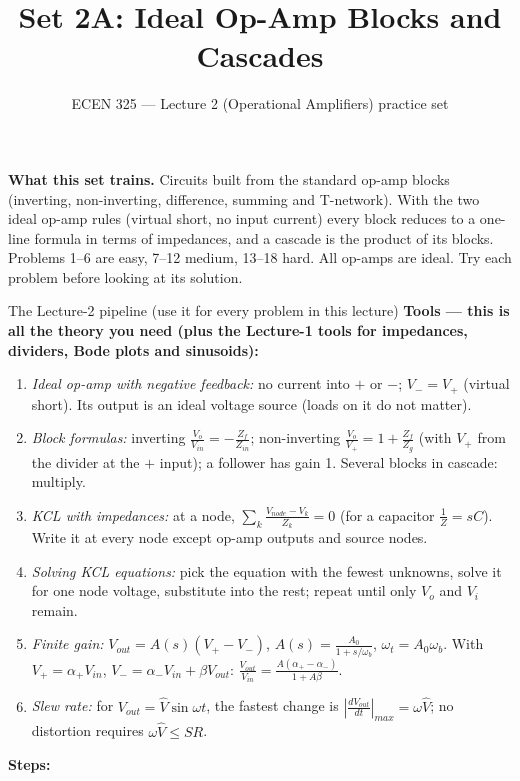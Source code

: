 \documentclass[11pt]{article}
\title{Set 2A: Ideal Op-Amp Blocks and Cascades}
\author{ECEN 325 --- Lecture 2 (Operational Amplifiers) practice set}
\date{}
\begin{document}
\maketitle

\textbf{What this set trains.} Circuits built from the standard op-amp blocks (inverting, non-inverting,
difference, summing and T-network). With the two ideal op-amp rules (virtual short, no input current) every block
reduces to a one-line formula in terms of impedances, and a cascade is the product of its blocks. Problems 1--6 are
easy, 7--12 medium, 13--18 hard. All op-amps are ideal. Try each problem before looking at its solution.


\begin{cardbox}{The Lecture-2 pipeline (use it for every problem in this lecture)}
\textbf{Tools --- this is all the theory you need (plus the Lecture-1 tools for impedances, dividers, Bode plots
and sinusoids):}
\begin{enumerate}[label=\textbf{T\arabic*},leftmargin=2.2em,itemsep=1pt]
\item \emph{Ideal op-amp with negative feedback:} no current into $+$ or $-$; $V_-=V_+$ (virtual short).
      Its output is an ideal voltage source (loads on it do not matter).
\item \emph{Block formulas:} inverting $\frac{V_o}{V_{in}}=-\frac{Z_f}{Z_{in}}$; non-inverting
      $\frac{V_o}{V_+}=1+\frac{Z_f}{Z_g}$ (with $V_+$ from the divider at the $+$ input); a follower has gain 1.
      Several blocks in cascade: multiply.
\item \emph{KCL with impedances:} at a node, $\sum_k \frac{V_{node}-V_k}{Z_k}=0$ (for a capacitor
      $\frac{1}{Z}=sC$). Write it at every node except op-amp outputs and source nodes.
\item \emph{Solving KCL equations:} pick the equation with the fewest unknowns, solve it for one node voltage,
      substitute into the rest; repeat until only $V_o$ and $V_i$ remain.
\item \emph{Finite gain:} $V_{out}=A(s)(V_+-V_-)$, $A(s)=\frac{A_0}{1+s/\omega_b}$, $\omega_t=A_0\omega_b$.
      With $V_+=\alpha_+V_{in}$, $V_-=\alpha_-V_{in}+\beta V_{out}$: $\frac{V_{out}}{V_{in}}=\frac{A(\alpha_+-\alpha_-)}{1+A\beta}$.
\item \emph{Slew rate:} for $V_{out}=\hat V\sin\omega t$, the fastest change is $\left|\frac{dV_{out}}{dt}\right|_{max}=\omega\hat V$;
      no distortion requires $\omega\hat V\le SR$.
\end{enumerate}
\textbf{Steps:}
\begin{enumerate}[leftmargin=2.2em,itemsep=1pt]

\end{enumerate}
\end{cardbox}
\end{document}
